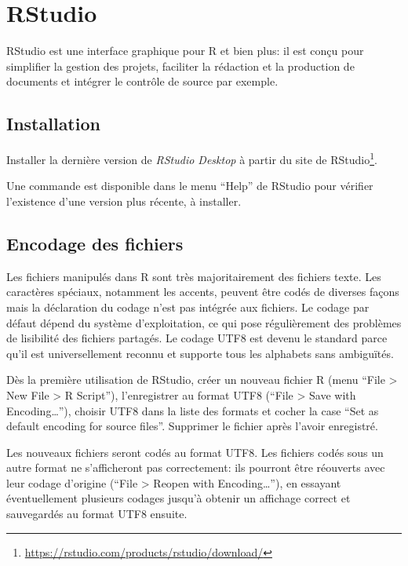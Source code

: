 \documentclass[
  12pt,
  french,
  a4paper,
  extrafontsizes,onecolumn,openright
  ]{memoir}
\newlength{\rf}
\begin{document}
\normalsize

\hypertarget{rstudio}{%
\section{RStudio}\label{rstudio}}

RStudio est une interface graphique pour R et bien plus: il est conçu pour simplifier la gestion des projets, faciliter la rédaction et la production de documents et intégrer le contrôle de source par exemple.

\hypertarget{installation-1}{%
\subsection{Installation}\label{installation-1}}

Installer la dernière version de \emph{RStudio Desktop} à partir du site de RStudio\footnote{\url{https://rstudio.com/products/rstudio/download/}}.

Une commande est disponible dans le menu \enquote{Help} de RStudio pour vérifier l'existence d'une version plus récente, à installer.

\hypertarget{encodage-des-fichiers}{%
\subsection{Encodage des fichiers}\label{encodage-des-fichiers}}

Les fichiers manipulés dans R sont très majoritairement des fichiers texte.
Les caractères spéciaux, notamment les accents, peuvent être codés de diverses façons mais la déclaration du codage n'est pas intégrée aux fichiers.
Le codage par défaut dépend du système d'exploitation, ce qui pose régulièrement des problèmes de lisibilité des fichiers partagés.
Le codage UTF8 est devenu le standard parce qu'il est universellement reconnu et supporte tous les alphabets sans ambiguïtés.

Dès la première utilisation de RStudio, créer un nouveau fichier R (menu \enquote{File \textgreater{} New File \textgreater{} R Script}), l'enregistrer au format UTF8 (\enquote{File \textgreater{} Save with Encoding\ldots{}}), choisir UTF8 dans la liste des formats et cocher la case \enquote{Set as default encoding for source files}.
Supprimer le fichier après l'avoir enregistré.

Les nouveaux fichiers seront codés au format UTF8.
Les fichiers codés sous un autre format ne s'afficheront pas correctement: ils pourront être réouverts avec leur codage d'origine (\enquote{File \textgreater{} Reopen with Encoding\ldots{}}), en essayant éventuellement plusieurs codages jusqu'à obtenir un affichage correct et sauvegardés au format UTF8 ensuite.
\end{document}

